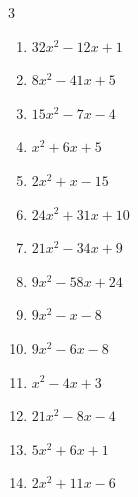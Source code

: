 \begin{multicols}{3}
\begin{enumerate}
  \item $32x^{2}-12x+1$

        \phantom{$=(4x-1)(8x-1)$}

  \item $8x^{2}-41x+5$

        \phantom{$=(8x-1)(x-5)$}

  \item $15x^{2}-7x-4$

        \phantom{$=(5x-4)(3x+1)$}

\columnbreak %

  \item $x^{2}+6x+5$

        \phantom{$=(x+5)(x+1)$}

  \item $2x^{2}+x-15$

        \phantom{$=(x+3)(2x-5)$}

  \item $24x^{2}+31x+10$

        \phantom{$=(3x+2)(8x+5)$}

  \item $21x^{2}-34x+9$

        \phantom{$=(7x-9)(3x-1)$}

  \item $9x^{2}-58x+24$

        \phantom{$=(9x-4)(x-6)$}

  \item $9x^{2}-x-8$

        \phantom{$=(x-1)(9x+8)$}

  \item $9x^{2}-6x-8$

        \phantom{$=(3x+2)(3x-4)$}

  \item $x^{2}-4x+3$

        \phantom{$=(x-3)(x-1)$}

  \item $21x^{2}-8x-4$

        \phantom{$=(7x+2)(3x-2)$}

  \item $5x^{2}+6x+1$

        \phantom{$=(x+1)(5x+1)$}

\columnbreak %

  \item $2x^{2}+11x-6$

        \phantom{$=(x+6)(2x-1)$}


\end{enumerate}
\end{multicols}
